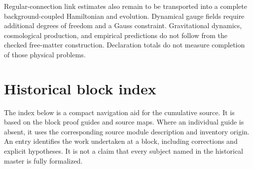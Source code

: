 Regular-connection link estimates also remain to be transported into a complete background-coupled Hamiltonian and evolution. Dynamical gauge fields require additional degrees of freedom and a Gauss constraint. Gravitational dynamics, cosmological production, and empirical predictions do not follow from the checked free-matter construction. Declaration totals do not measure completion of those physical problems.


\section{Historical block index}

The index below is a compact navigation aid for the cumulative source. It is based on the block proof guides and source maps. Where an individual guide is absent, it uses the corresponding source module description and inventory origin. An entry identifies the work undertaken at a block, including corrections and explicit hypotheses. It is not a claim that every subject named in the historical master is fully formalized.

